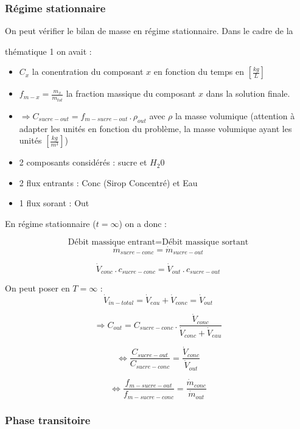 \documentclass[fr]{../../../eplsummary}
\begin{document}
\subsubsection{Régime stationnaire}

\par On peut vérifier le bilan de masse en régime stationnaire. Dans le cadre de la 

thématique 1 on avait :

\begin{itemize}
    \item $C_{x}$ la conentration du composant $x$ en fonction du temps en $[ \frac{kg}{L}]$ 
    \item $f_{m-x} = \frac{m_{x}}{m_{tot}}$ la fraction massique du composant $x$ dans la solution finale.
    \item $\Rightarrow C_{sucre-out} = f_{m-sucre-out} \, . \, \rho_{out}$ avec $\rho$ la masse volumique (attention à adapter les unités en fonction du problème, la masse volumique ayant les unités $[\frac{kg}{m^{3}}]$)
    \item 2 composants considérés : sucre et $H_{2}0$
    \item 2 flux entrants : Conc (Sirop Concentré) et Eau
    \item 1 flux sorant : Out\\

\end{itemize}
\par En régime stationnaire ($t=\infty$) on a donc :

$$\mbox{Débit massique entrant}=\mbox{Débit massique sortant}  $$
$$\dot{m}_{sucre-conc} = \dot{m}_{sucre-out}$$

$$\dot{V}_{conc} \, . \, c_{sucre-conc} = \dot{V}_{out} \, . \, c_{sucre-out} $$

\par On peut poser en $T=\infty$ : \\
$$\dot{V}_{in-total} = \dot{V}_{eau} + \dot{V}_{conc} = \dot{V}_{out}$$

$$\Rightarrow C_{out} = C_{sucre-conc} \, . \, \frac{\dot{V}_{conc}}{\dot{V}_{conc} + \dot{V}_{eau}}$$

$$\Leftrightarrow \frac{C_{sucre-out}}{C_{sucre-conc}} = \frac{\dot{V}_{conc}}{\dot{V}_{out}}$$

$$\Leftrightarrow \frac{f_{m-sucre-out}}{f_{m-sucre-conc}} = \frac{\dot{m}_{conc}}{\dot{m}_{out}}$$
 
\subsubsection{Phase transitoire}
\end{document}
